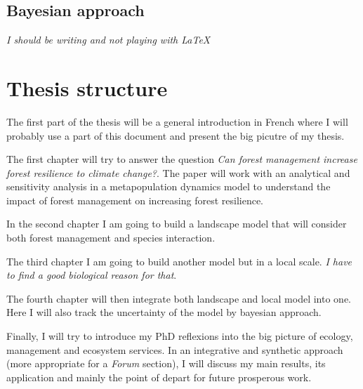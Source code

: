 \subsection{Bayesian approach}

\textit{I should be writing and not playing with \LaTeX}

\section{Thesis structure}

The first part of the thesis will be a general introduction in French where  I will probably use a part of this document and present the big picutre of my thesis.

The first chapter will try to answer the question \textit{Can forest management increase forest resilience to climate change?}. The paper will work with an analytical and sensitivity analysis in a metapopulation dynamics model to understand the impact of forest management on increasing forest resilience.

In the second chapter I am going to build a landscape model that will consider both forest management and species interaction.

The third chapter I am going to build another model but in a local scale. \textit{I have to find a good biological reason for that}.

The fourth chapter will then integrate both landscape and local model into one. Here I will also track the uncertainty of the model by bayesian approach.

Finally, I will try to introduce my PhD reflexions into the big picture of ecology, management and ecosystem services. In an integrative and synthetic approach (more appropriate for a \textit{Forum} section), I will discuss my main results, its application and mainly the point of depart for future prosperous work.

\clearpage



